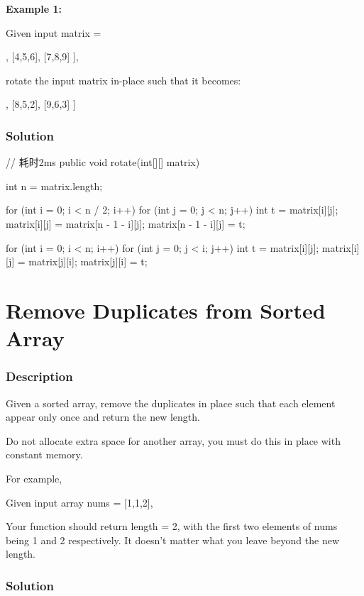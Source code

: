 \textbf{Example 1:}

Given input matrix =
\begin{Code}
[
  [1,2,3],
  [4,5,6],
  [7,8,9]
],
\end{Code}

rotate the input matrix in-place such that it becomes:
\begin{Code}
[
  [7,4,1],
  [8,5,2],
  [9,6,3]
]
\end{Code}

\subsubsection{Solution}

\begin{Code}
// 耗时2ms
public void rotate(int[][] matrix) {
    int n = matrix.length;

    for (int i = 0; i < n / 2; i++) {
        for (int j = 0; j < n; j++) {
            int t = matrix[i][j];
            matrix[i][j] = matrix[n - 1 - i][j];
            matrix[n - 1 - i][j] = t;
        }
    }

    for (int i = 0; i < n; i++) {
        for (int j = 0; j < i; j++) {
            int t = matrix[i][j];
            matrix[i][j] = matrix[j][i];
            matrix[j][i] = t;
        }
    }
}
\end{Code}

\newpage

\section{Remove Duplicates from Sorted Array} %

\subsubsection{Description}
Given a sorted array, remove the duplicates in place such that each element appear only once and return the new length.

Do not allocate extra space for another array, you must do this in place with constant memory.

For example,

Given input array nums = [1,1,2],

Your function should return length = 2, with the first two elements of nums being 1 and 2 respectively. It doesn't matter what you leave beyond the new length.

\subsubsection{Solution}

